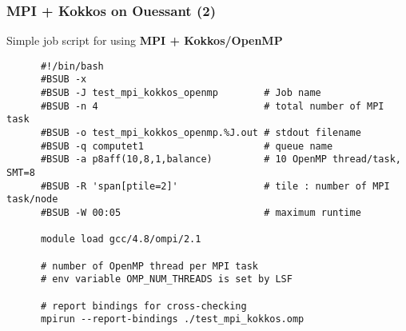 \begin{frame}[fragile=singleslide]
  \frametitle{MPI + Kokkos on Ouessant (2)}

  {\Large Simple job script for using \textbf{MPI + Kokkos/OpenMP}}

  {\small
    \begin{verbatim}
      #!/bin/bash
      #BSUB -x
      #BSUB -J test_mpi_kokkos_openmp        # Job name
      #BSUB -n 4                             # total number of MPI task
      #BSUB -o test_mpi_kokkos_openmp.%J.out # stdout filename
      #BSUB -q computet1                     # queue name
      #BSUB -a p8aff(10,8,1,balance)         # 10 OpenMP thread/task, SMT=8
      #BSUB -R 'span[ptile=2]'               # tile : number of MPI task/node
      #BSUB -W 00:05                         # maximum runtime
            
      module load gcc/4.8/ompi/2.1
      
      # number of OpenMP thread per MPI task
      # env variable OMP_NUM_THREADS is set by LSF
      
      # report bindings for cross-checking
      mpirun --report-bindings ./test_mpi_kokkos.omp
    \end{verbatim}
  }
\end{frame}

